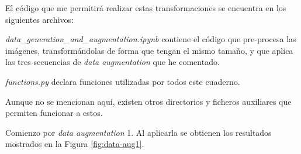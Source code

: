 El código que me permitirá realizar estas transformaciones se encuentra en los siguientes archivos:

\vspace{0.2cm}

\noindent \textit{{data\_generation\_and\_augmentation.ipynb}} contiene el código que pre-procesa las imágenes, transformándolas de forma que tengan el mismo tamaño, y que aplica las tres secuencias de \textit{data augmentation} que he comentado.

\noindent \textit{functions.py} declara funciones utilizadas por todos este cuaderno.

\noindent Aunque no se mencionan aquí, existen otros directorios y ficheros auxiliares que permiten funcionar a estos.

Comienzo por \textit{data augmentation} 1. Al aplicarla se obtienen los resultados mostrados en la Figura \ref{fig:data-aug1}.

